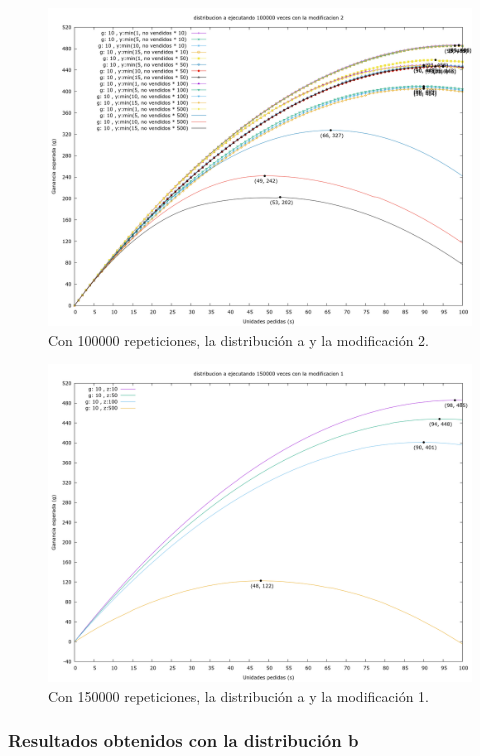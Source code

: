 \documentclass[12pt, spanish]{article}
\begin{document}
\begin{figure}[H]
	\centering
	\includegraphics[scale = 0.3]{prob_a/datos_a_100000_2.png}
	\caption{Con 100000 repeticiones, la distribución a y la modificación 2.}
	\label{fig:ej1_a_100000}

\end{figure}

\begin{figure}[H]
	\centering
	\includegraphics[scale = 0.3]{prob_a/datos_a_150000_1.png}
	\caption{Con 150000 repeticiones, la distribución a y la modificación 1.}
	\label{fig:ej1_a_150000}

\end{figure}


\subsubsection{Resultados obtenidos con la distribución b}
\end{document}
